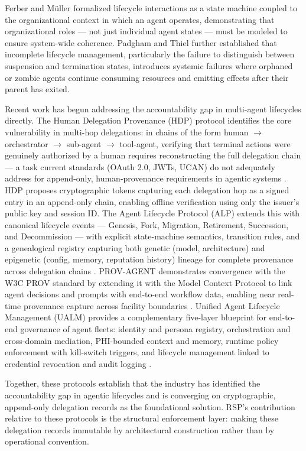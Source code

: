 Ferber and M\"uller \cite{ferber1996} formalized lifecycle interactions as a state machine coupled to the organizational context in which an agent operates, demonstrating that organizational roles --- not just individual agent states --- must be modeled to ensure system-wide coherence. Padgham and Thiel \cite{padgham2001} further established that incomplete lifecycle management, particularly the failure to distinguish between suspension and termination states, introduces systemic failures where orphaned or zombie agents continue consuming resources and emitting effects after their parent has exited.

Recent work has begun addressing the accountability gap in multi-agent lifecycles directly. The Human Delegation Provenance (HDP) protocol identifies the core vulnerability in multi-hop delegations: in chains of the form human $\rightarrow$ orchestrator $\rightarrow$ sub-agent $\rightarrow$ tool-agent, verifying that terminal actions were genuinely authorized by a human requires reconstructing the full delegation chain --- a task current standards (OAuth 2.0, JWTs, UCAN) do not adequately address for append-only, human-provenance requirements in agentic systems \cite{hdp-draft,hdp-draft-2}. HDP proposes cryptographic tokens capturing each delegation hop as a signed entry in an append-only chain, enabling offline verification using only the issuer's public key and session ID. The Agent Lifecycle Protocol (ALP) extends this with canonical lifecycle events --- Genesis, Fork, Migration, Retirement, Succession, and Decommission --- with explicit state-machine semantics, transition rules, and a genealogical registry capturing both genetic (model, architecture) and epigenetic (config, memory, reputation history) lineage for complete provenance across delegation chains \cite{alp2025}. PROV-AGENT demonstrates convergence with the W3C PROV standard by extending it with the Model Context Protocol to link agent decisions and prompts with end-to-end workflow data, enabling near real-time provenance capture across facility boundaries \cite{prov-agent2025}. Unified Agent Lifecycle Management (UALM) provides a complementary five-layer blueprint for end-to-end governance of agent fleets: identity and persona registry, orchestration and cross-domain mediation, PHI-bounded context and memory, runtime policy enforcement with kill-switch triggers, and lifecycle management linked to credential revocation and audit logging \cite{ualm2025}.

Together, these protocols establish that the industry has identified the accountability gap in agentic lifecycles and is converging on cryptographic, append-only delegation records as the foundational solution. RSP's contribution relative to these protocols is the structural enforcement layer: making these delegation records immutable by architectural construction rather than by operational convention.

